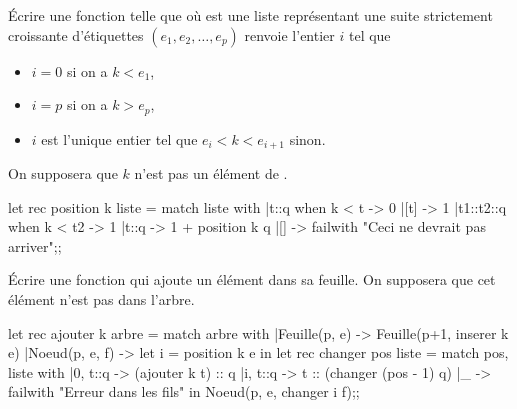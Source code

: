 \begin{question}{}{}
Écrire une fonction  telle que  où  est une liste représentant une suite strictement croissante d'étiquettes $(e_1, e_2, \ldots, e_p)$ renvoie l'entier $i$ tel que
\begin{itemize}
    \item $i=0$ si on a $k < e_1$,
    \item $i=p$ si on a $k > e_p$,
    \item $i$ est l'unique entier tel que $e_i < k < e_{i+1}$ sinon.
\end{itemize}
On supposera que $k$ n'est pas un élément de .
\reponse
\begin{ocaml}
let rec position k liste =
   match liste with
   |t::q when k < t -> 0
   |[t] -> 1
   |t1::t2::q when k < t2 -> 1
   |t::q  -> 1 + position k q
   |[] -> failwith "Ceci ne devrait pas arriver";;
\end{ocaml}
\end{question}
\begin{question}{}{}
Écrire une fonction  qui ajoute un élément dans sa feuille. On supposera que cet élément n'est pas dans l'arbre.
\reponse
\begin{ocaml}
let rec ajouter k arbre =
   match arbre with
   |Feuille(p, e) -> Feuille(p+1, inserer k e)
   |Noeud(p, e, f) -> let i = position k e in
                      let rec changer pos liste = 
                         match pos, liste with
                         |0, t::q -> (ajouter k t) :: q
                         |i, t::q -> t :: (changer (pos - 1) q)
                         |_ -> failwith "Erreur dans les fils" in
                      Noeud(p, e, changer i f);;
\end{ocaml}
\end{question}
